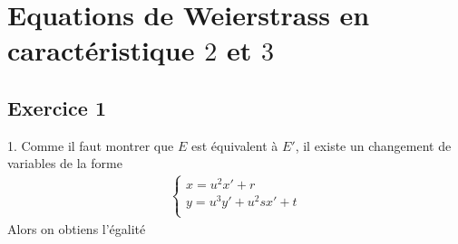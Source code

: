 \chapter{Equations de Weierstrass en caractéristique $2$ et $3$}
    \section{Exercice 1}
        \begin{question}{1.}
            Comme il faut montrer que $E$ est équivalent à $E'$, il existe un changement de variables de la forme
            \begin{align*}
                \begin{cases}
                    x = u^2x' + r \\
                    y = u^3y' + u^2sx' + t \\
                \end{cases}
            \end{align*}
            Alors on obtiens l'égalité 
        \end{question}